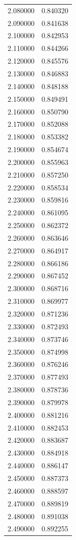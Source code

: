 \begin{tabular}{rr}
2.080000 & 0.840320 \\
2.090000 & 0.841638 \\
2.100000 & 0.842953 \\
2.110000 & 0.844266 \\
2.120000 & 0.845576 \\
2.130000 & 0.846883 \\
2.140000 & 0.848188 \\
2.150000 & 0.849491 \\
2.160000 & 0.850790 \\
2.170000 & 0.852088 \\
2.180000 & 0.853382 \\
2.190000 & 0.854674 \\
2.200000 & 0.855963 \\
2.210000 & 0.857250 \\
2.220000 & 0.858534 \\
2.230000 & 0.859816 \\
2.240000 & 0.861095 \\
2.250000 & 0.862372 \\
2.260000 & 0.863646 \\
2.270000 & 0.864917 \\
2.280000 & 0.866186 \\
2.290000 & 0.867452 \\
2.300000 & 0.868716 \\
2.310000 & 0.869977 \\
2.320000 & 0.871236 \\
2.330000 & 0.872493 \\
2.340000 & 0.873746 \\
2.350000 & 0.874998 \\
2.360000 & 0.876246 \\
2.370000 & 0.877493 \\
2.380000 & 0.878736 \\
2.390000 & 0.879978 \\
2.400000 & 0.881216 \\
2.410000 & 0.882453 \\
2.420000 & 0.883687 \\
2.430000 & 0.884918 \\
2.440000 & 0.886147 \\
2.450000 & 0.887373 \\
2.460000 & 0.888597 \\
2.470000 & 0.889819 \\
2.480000 & 0.891038 \\
2.490000 & 0.892255 \\

\end{tabular}
